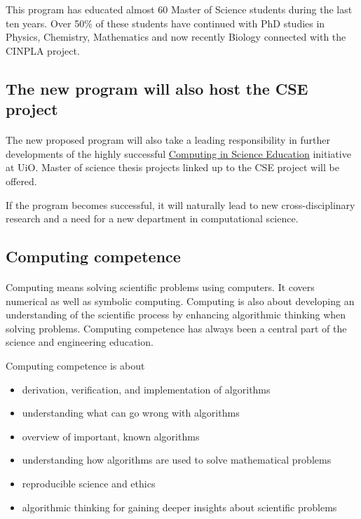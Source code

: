 \documentclass[%
oneside,                 %
final,                   %
10pt]{article}
\begin{document}
This program has educated almost 60 Master of Science students during
the last ten years.  Over 50\% of these students have continued with
PhD studies in Physics, Chemistry, Mathematics and now recently
Biology connected with the CINPLA project.



\subsection*{The new program will also host the CSE project}

\paragraph{}

The new proposed program will also take a leading responsibility in further
developments of the highly successful \href{{http://www.mn.uio.no/english/about/collaboration/cse/}}{Computing in Science Education} initiative at UiO.  Master of science thesis projects linked up to the CSE project will be offered. 

If the program becomes successful, it will naturally lead to
new cross-disciplinary research and a need for a new department
in computational science.




\subsection*{Computing competence}

\paragraph{}
Computing means solving scientific problems using computers. It covers
numerical as well as symbolic computing. Computing is also about
developing an understanding of the scientific process by enhancing 
algorithmic thinking when solving problems.  Computing competence has
always been a central part of the science and engineering
education. 

Computing competence is about

\begin{itemize}
\item derivation, verification, and implementation of algorithms

\item understanding what can go wrong with algorithms

\item overview of important, known algorithms

\item understanding how algorithms are used to solve mathematical problems

\item reproducible science and ethics

\item algorithmic thinking for gaining deeper insights about scientific problems
\end{itemize}
\end{document}
